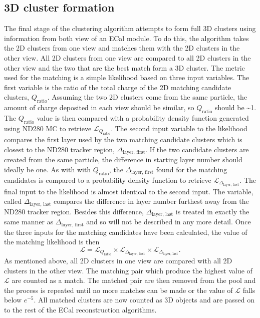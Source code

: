 \subsection{3D cluster formation}
\label{subsec:ECal3DMatching}
The final stage of the clustering algorithm attempts to form full 3D clusters using information from both view of an ECal module.  To do this, the algorithm takes the 2D clusters from one view and matches them with the 2D clusters in the other view.  All 2D clusters from one view are compared to all 2D clusters in the other view and the two that are the best match form a 3D cluster.  The metric used for the matching is a simple likelihood based on three input variables.  The first variable is the ratio of the total charge of the 2D matching candidate clusters, $Q_{\textrm{ratio}}$.  Assuming the two 2D clusters come from the same particle, the amount of charge deposited in each view should be similar, so $Q_{\textrm{ratio}}$ should be \sim1.  The $Q_{\textrm{ratio}}$ value is then compared with a probability density function generated using ND280 MC to retrieve $\mathcal{L}_{Q_{\textrm{ratio}}}$.  The second input variable to the likelihood compares the first layer used by the two matching candidate clusters which is closest to the ND280 tracker region, $\Delta_{\textrm{layer, first}}$.  If the two candidate clusters are created from the same particle, the difference in starting layer number should ideally be one.  As with with $Q_{\textrm{ratio}}$, the $\Delta_{\textrm{layer, first}}$ found for the matching candidates is compared to a probability density function to retrieve $\mathcal{L}_{\Delta_{\textrm{layer, first}}}$.  The final input to the likelihood is almost identical to the second input.  The variable, called $\Delta_{\textrm{layer, last}}$ compares the difference in layer number furthest away from the ND280 tracker region.  Besides this difference, $\Delta_{\textrm{layer, last}}$ is treated in exactly the same manner as $\Delta_{\textrm{layer, first}}$ and so will not be described in any more detail.
\newline
Once the three inputs for the matching candidates have been calculated, the value of the matching likelihood is then
\begin{equation}
  \mathcal{L} = \mathcal{L}_{Q_{\textrm{ratio}}} \times \mathcal{L}_{\Delta_{\textrm{layer, first}}} \times \mathcal{L}_{\Delta_{\textrm{layer, last}}}.
\end{equation}
As mentioned above, all 2D clusters in one view are compared with all 2D clusters in the other view.  The matching pair which produce the highest value of $\mathcal{L}$ are counted as a match.  The matched pair are then removed from the pool and the process is repeated until no more matches can be made or the value of $\mathcal{L}$ falls below $e^{-5}$.  All matched clusters are now counted as 3D objects and are passed on to the rest of the ECal reconstruction algorithms.

